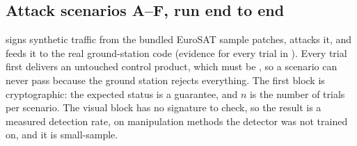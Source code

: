 \subsection{Attack scenarios A--F, run end to end}\label{sec:scenarios}
 signs synthetic traffic from the bundled EuroSAT sample patches, attacks it, and feeds it to the real ground-station code (evidence for every trial in ). Every trial first delivers an untouched control product, which must be , so a scenario can never pass because the ground station rejects everything. The first block is cryptographic: the expected status is a guarantee, and $n$ is the number of trials per scenario. The visual block has no signature to check, so the result is a measured detection rate, on manipulation methods the detector was not trained on, and it is small-sample.

